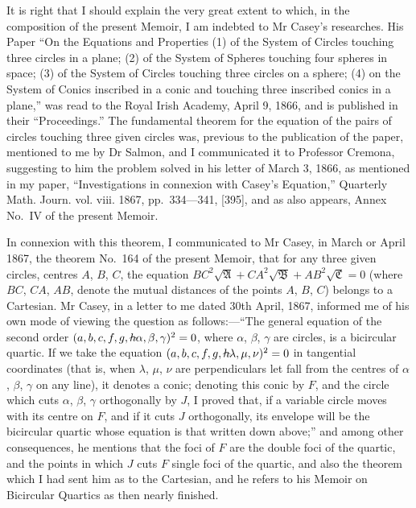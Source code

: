 \documentclass[11pt,a4paper]{article}
\theoremstyle{definition}
\begin{document}
It is right that I should explain the very great extent to which, in the composition of the present Memoir, I am indebted to Mr Casey's researches. His Paper ``On the Equations and Properties (1) of the System of Circles touching three circles in a plane; (2) of the System of Spheres touching four spheres in space; (3) of the System of Circles touching three circles on a sphere; (4) on the System of Conics inscribed in a conic and touching three inscribed conics in a plane,'' was read to the Royal Irish Academy, April 9, 1866, and is published in their ``Proceedings.'' The fundamental theorem for the equation of the pairs of circles touching three given circles was, previous to the publication of the paper, mentioned to me by Dr Salmon, and I communicated it to Professor Cremona, suggesting to him the problem solved in his letter of March 3, 1866, as mentioned in my paper, ``Investigations in connexion with Casey's Equation,'' Quarterly Math. Journ. vol. viii. 1867, pp.~334---341, [395], and as also appears, Annex No.~IV of the present Memoir.

In connexion with this theorem, I communicated to Mr Casey, in March or April 1867, the theorem No.~164 of the present Memoir, that for any three given circles, centres $A$, $B$, $C$, the equation $BC^2\sqrt{\mathfrak{A}}+CA^2\sqrt{\mathfrak{B}}+AB^2\sqrt{\mathfrak{C}}=0$ (where $BC$, $CA$, $AB$, denote the mutual distances of the points $A$, $B$, $C$) belongs to a Cartesian. Mr Casey, in a letter to me dated 30th April, 1867, informed me of his own mode of viewing the question as follows:---``The general equation of the second order $(a,b,c,f,g,h\!\hbox{\hspace{-0.5em}}\raisebox{0.3ex}{$\scriptstyle\frown$}\!\alpha,\beta,\gamma)^2=0$, where $\alpha$, $\beta$, $\gamma$ are circles, is a bicircular quartic. If we take the equation $(a,b,c,f,g,h\!\hbox{\hspace{-0.5em}}\raisebox{0.3ex}{$\scriptstyle\frown$}\!\lambda,\mu,\nu)^2=0$ in tangential coordinates (that is, when $\lambda$, $\mu$, $\nu$ are perpendiculars let fall from the centres of $\alpha$, $\beta$, $\gamma$ on any line), it denotes a conic; denoting this conic by $F$, and the circle which cuts $\alpha$, $\beta$, $\gamma$ orthogonally by $J$, I proved that, if a variable circle moves with its centre on $F$, and if it cuts $J$ orthogonally, its envelope will be the bicircular quartic whose equation is that written down above;'' and among other consequences, he mentions that the foci of $F$ are the double foci of the quartic, and the points in which $J$ cuts $F$ single foci of the quartic, and also the theorem which I had sent him as to the Cartesian, and he refers to his Memoir on Bicircular Quartics as then nearly finished.
\end{document}
